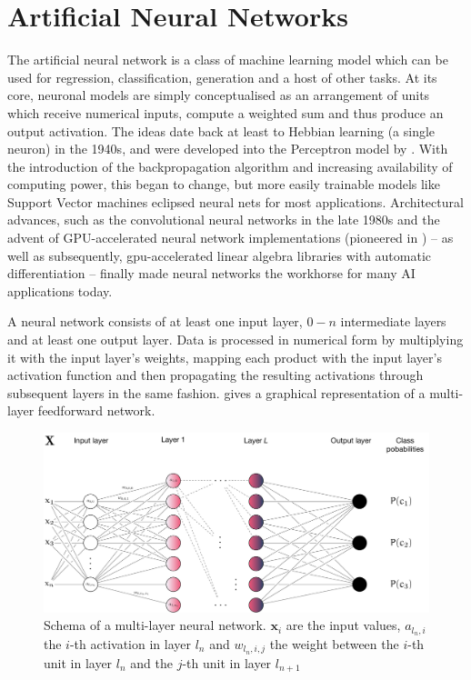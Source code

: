 \hypertarget{sec:anns}{%
\section{Artificial Neural Networks}\label{sec:anns}}

The artificial neural network is a class of machine learning model which can be
used for regression, classification, generation and a host of other tasks.  At
its core, neuronal models are simply conceptualised as an arrangement of units
which receive numerical inputs, compute a weighted sum and thus produce an output
activation. The ideas date back at least to Hebbian learning (a single neuron)
in the 1940s, and were developed into the Perceptron model by
\citet{Rosenblatt58theperceptron}. With the introduction of the backpropagation
algorithm \citep{werbos1975beyond} and increasing availability of computing
power, this began to change, but more easily trainable models like Support
Vector machines eclipsed neural nets for most applications.  Architectural
advances, such as the convolutional neural networks in the late 1980s
\citep{LeCun:1989:BAH:1351079.1351090} and the advent of GPU-accelerated neural
network implementations (pioneered in \cite{Ciresan11flexible}) -- as well as
subsequently, gpu-accelerated linear algebra libraries with automatic
differentiation -- finally made neural networks the workhorse for many AI
applications today.

A neural network consists of at least one input layer, \(0-n\)
intermediate layers and at least one output layer. Data is processed in
numerical form by multiplying it with the input layer's weights, mapping
each product with the input layer's activation function and then
propagating the resulting activations through subsequent layers in the
same fashion.  gives a graphical representation of a
multi-layer feedforward network.

\begin{figure}
    \hypertarget{fig:neuralnet}{%
        \centering
        \includegraphics[max width=\textwidth]{gfx/diagrams/neural_network/neural_net.pdf}
        \caption[Schema of a multi-layer neural network]{Schema of a multi-layer neural network. \(\mathbf{x}_i\) are
            the input values, \(a_{l_n,i}\) the \(i\)-th activation in layer \(l_n\)
            and \(w_{l_n,i,j}\) the weight between the \(i\)-th unit in layer
        \(l_n\) and the \(j\)-th unit in layer \(l_{n+1}\)}\label{fig:neuralnet}
    }
\end{figure}

